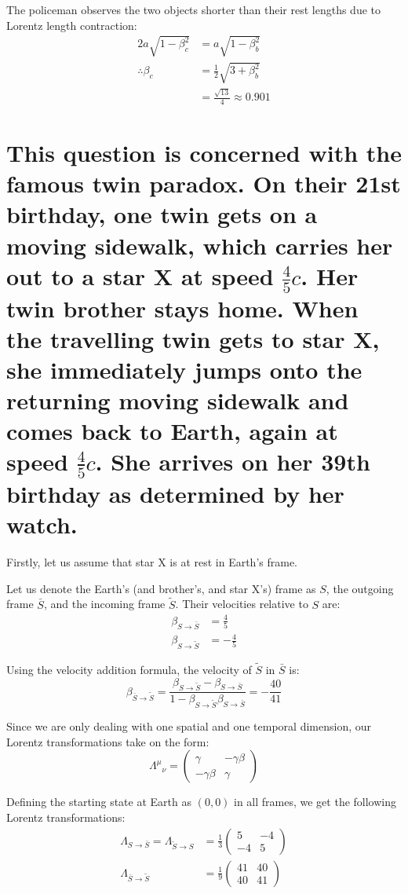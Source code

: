 \documentclass[a4paper]{scrartcl}
\begin{document}
The policeman observes the two objects shorter than their rest lengths due to Lorentz length contraction:
\begin{align*}
    2 a \sqrt{1 - \beta_c^2} &= a \sqrt{1 - \beta_b^2} \\
    \therefore \beta_c &= \frac{1}{2} \sqrt{3 + \beta_b^2} \\
    &= \frac{\sqrt{13}}{4} \approx 0.901
\end{align*}

\section{This question is concerned with the famous twin paradox. On their 21st birthday, one twin gets on a moving sidewalk, which carries her out to a star X at speed \(\frac{4}{5} c\). Her twin brother stays home. When the travelling twin gets to star X, she immediately jumps onto the returning moving sidewalk and comes back to Earth, again at speed \(\frac{4}{5} c\). She arrives on her 39th birthday as determined by her watch.}
Firstly, let us assume that star X is at rest in Earth's frame.

Let us denote the Earth's (and brother's, and star X's) frame as \(S\), the outgoing frame \(\bar{S}\), and the incoming frame \(\tilde{S}\). Their velocities relative to \(S\) are:
\begin{align*}
    \beta_{S \to \bar{S}} &= \frac{4}{5} \\
    \beta_{S \to \tilde{S}} &= -\frac{4}{5}
\end{align*}

Using the velocity addition formula, the velocity of \(\tilde{S}\) in \(\bar{S}\) is:
\[\beta_{\bar{S} \to \tilde{S}} = \frac{\beta_{S \to \tilde{S}} - \beta_{S \to \bar{S}}}{1 - \beta_{S \to \tilde{S}} \beta_{S \to \bar{S}}} = -\frac{40}{41}\]

Since we are only dealing with one spatial and one temporal dimension, our Lorentz transformations take on the form:
\[{\Lambda^\mu}_\nu = \begin{pmatrix}\gamma & -\gamma \beta \\ -\gamma \beta & \gamma\end{pmatrix}\]

Defining the starting state at Earth as \((0, 0)\) in all frames, we get the following Lorentz transformations:
\begin{align*}
    \Lambda_{S \to \bar{S}} = \Lambda_{\tilde{S} \to S} &= \frac{1}{3} \begin{pmatrix}5 & -4 \\ -4 & 5\end{pmatrix} \\
    \Lambda_{\bar{S} \to \tilde{S}} &= \frac{1}{9} \begin{pmatrix}41 & 40 \\ 40 & 41\end{pmatrix}
\end{align*}
\end{document}

